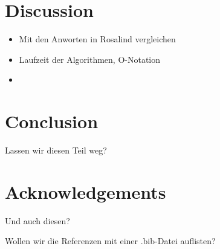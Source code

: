 \documentclass{bioinfo}
\begin{document}
\section{Discussion}

\begin{itemize}
\item Mit den Anworten in Rosalind vergleichen
\item Laufzeit der Algorithmen, O-Notation 
\item  
\end{itemize}

\section{Conclusion}
Lassen wir diesen Teil weg?

\section*{Acknowledgements}
Und auch diesen?
%
%
%
%
%
%
%
%
%

\begin{thebibliography}{}
Wollen wir die Referenzen mit einer .bib-Datei auflisten?




\end{thebibliography}
\end{document}
